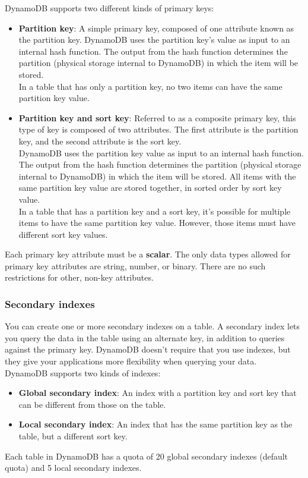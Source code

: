 \documentclass[12pt, letterpaper, twoside]{article}
\begin{document}
DynamoDB supports two different kinds of primary keys:
\begin{itemize}
	\item \textbf{Partition key}: A simple primary key, composed of one attribute known as the partition key.
		DynamoDB uses the partition key's value as input to an internal hash function. The output from the hash function 
		determines the partition (physical storage internal to DynamoDB) in which the item will be stored.\\
		In a table that has only a partition key, no two items can have the same partition key value.
	\item \textbf{Partition key and sort key}: Referred to as a composite primary key, this type of key is composed of 
		two attributes. The first attribute is the partition key, and the second attribute is the sort key.\\
		DynamoDB uses the partition key value as input to an internal hash function. The output from the hash function 
		determines the partition (physical storage internal to DynamoDB) in which the item will be stored. All items with 
		the same partition key value are stored together, in sorted order by sort key value.\\
		In a table that has a partition key and a sort key, it's possible for multiple items to have the same partition 
		key value. However, those items must have different sort key values.
\end{itemize}

Each primary key attribute must be a \textbf{scalar}. The only data types allowed for primary key attributes are string, 
number, or binary. There are no such restrictions for other, non-key attributes.\\

\subsubsection{Secondary indexes}
You can create one or more secondary indexes on a table. A secondary index lets you query the data in the table using an 
alternate key, in addition to queries against the primary key. DynamoDB doesn't require that you use indexes, but they 
give your applications more flexibility when querying your data.\\
DynamoDB supports two kinds of indexes:
\begin{itemize}
	\item \textbf{Global secondary index}: An index with a partition key and sort key that can be different from those on the table.
	\item \textbf{Local secondary index}: An index that has the same partition key as the table, but a different sort key.
\end{itemize}
Each table in DynamoDB has a quota of 20 global secondary indexes (default quota) and 5 local secondary indexes.
\end{document}
